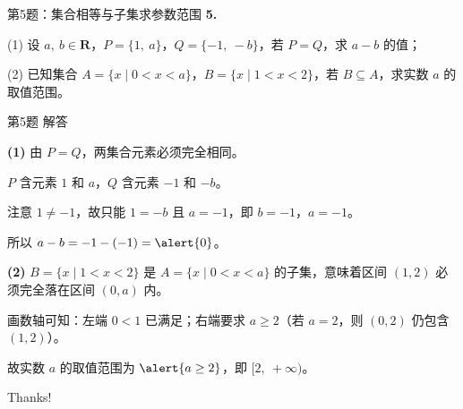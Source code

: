 \documentclass[10pt,aspectratio=169,serif]{beamer}
\begin{document}
\begin{frame}[t]{第5题：集合相等与子集求参数范围}
\textbf{5.}

(1) 设 $a,\ b \in \mathbf{R}$，$P = \{1,\ a\}$，$Q = \{-1,\ -b\}$，若 $P = Q$，求 $a - b$ 的值；

\vspace{0.8em}
(2) 已知集合 $A = \{x \mid 0 < x < a\}$，$B = \{x \mid 1 < x < 2\}$，若 $B \subseteq A$，求实数 $a$ 的取值范围。
\end{frame}

\begin{frame}[t]{第5题 解答}
\begin{tcolorbox}[colback=orange!10,colframe=orange,title=\textbf{解}]
\textbf{(1)} 由 $P = Q$，两集合元素必须完全相同。

$P$ 含元素 $1$ 和 $a$，$Q$ 含元素 $-1$ 和 $-b$。

注意 $1 \ne -1$，故只能 $1 = -b$ 且 $a = -1$，即 $b = -1$，$a = -1$。

所以 $a - b = -1 - (-1) = \alert{0}$。

\vspace{0.8em}
\textbf{(2)} $B = \{x \mid 1 < x < 2\}$ 是 $A = \{x \mid 0 < x < a\}$ 的子集，意味着区间 $(1,2)$ 必须完全落在区间 $(0,a)$ 内。

画数轴可知：左端 $0 < 1$ 已满足；右端要求 $a \ge 2$（若 $a = 2$，则 $(0,2)$ 仍包含 $(1,2)$）。

\vspace{0.3em}
故实数 $a$ 的取值范围为 $\alert{a \ge 2}$，即 $[2,\ +\infty)$。
\end{tcolorbox}
\end{frame}

\begin{frame}[c]
  \begin{center}
    {\Huge\calligra Thanks!}
  \end{center}
\end{frame}
\end{document}
